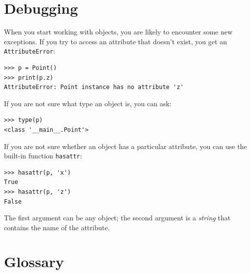 \documentclass[10pt]{book}
\begin{document}
\section{Debugging}
\label{hasattr}


When you start working with objects, you are likely to encounter
some new exceptions.  If you try to access an attribute
that doesn't exist, you get an {\tt AttributeError}:


\beforeverb
\begin{verbatim}
>>> p = Point()
>>> print(p.z)
AttributeError: Point instance has no attribute 'z'
\end{verbatim}
\afterverb
%
If you are not sure what type an object is, you can ask:


\beforeverb
\begin{verbatim}
>>> type(p)
<class '__main__.Point'>
\end{verbatim}
\afterverb
%
If you are not sure whether an object has a particular attribute,
you can use the built-in function {\tt hasattr}:


\beforeverb
\begin{verbatim}
>>> hasattr(p, 'x')
True
>>> hasattr(p, 'z')
False
\end{verbatim}
\afterverb
%
The first argument can be any object; the second argument is a {\em
string} that contains the name of the attribute.


\section{Glossary}
\end{document}
